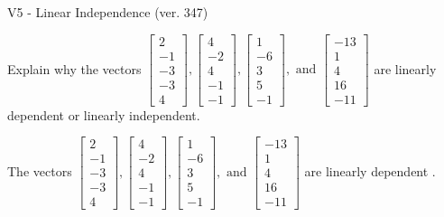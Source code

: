 \begin{exercise}
  \begin{exerciseTitle}V5 - Linear Independence (ver. 347)\end{exerciseTitle}
  \begin{exerciseStatement}
    Explain why the vectors \(\left[\begin{array}{r}
2 \\
-1 \\
-3 \\
-3 \\
4
\end{array}\right] , \left[\begin{array}{r}
4 \\
-2 \\
4 \\
-1 \\
-1
\end{array}\right] , \left[\begin{array}{r}
1 \\
-6 \\
3 \\
5 \\
-1
\end{array}\right] , \text{ and } \left[\begin{array}{r}
-13 \\
1 \\
4 \\
16 \\
-11
\end{array}\right]\) are linearly dependent or linearly independent.	


  \end{exerciseStatement}
  \begin{exerciseAnswer}
   The vectors \(\left[\begin{array}{r}
2 \\
-1 \\
-3 \\
-3 \\
4
\end{array}\right] , \left[\begin{array}{r}
4 \\
-2 \\
4 \\
-1 \\
-1
\end{array}\right] , \left[\begin{array}{r}
1 \\
-6 \\
3 \\
5 \\
-1
\end{array}\right] , \text{ and } \left[\begin{array}{r}
-13 \\
1 \\
4 \\
16 \\
-11
\end{array}\right]\) are 
  	 linearly dependent  .
  


  \end{exerciseAnswer}
\end{exercise}